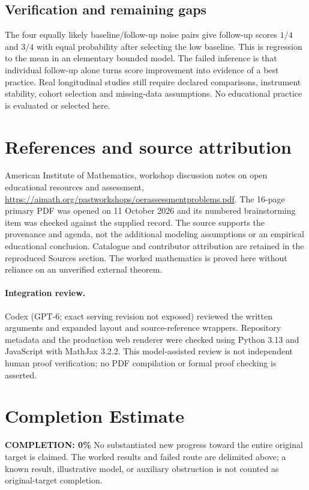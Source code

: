 \documentclass[11pt]{article}
\begin{document}
\subsection{Verification and remaining gaps}
The four equally likely baseline/follow-up noise pairs give follow-up scores $1/4$ and $3/4$ with equal probability after selecting the low baseline. This is regression to the mean in an elementary bounded model. The failed inference is that individual follow-up alone turns score improvement into evidence of a best practice. Real longitudinal studies still require declared comparisons, instrument stability, cohort selection and missing-data assumptions. No educational practice is evaluated or selected here.

\section{References and source attribution}
American Institute of Mathematics, workshop discussion notes on open educational resources and assessment, \url{https://aimath.org/pastworkshops/oerassessmentproblems.pdf}. The 16-page primary PDF was opened on 11 October 2026 and its numbered brainstorming item was checked against the supplied record. The source supports the provenance and agenda, not the additional modeling assumptions or an empirical educational conclusion. Catalogue and contributor attribution are retained in the reproduced Sources section. The worked mathematics is proved here without reliance on an unverified external theorem.


\paragraph{Integration review.} Codex (GPT-6; exact serving revision not exposed) reviewed the written arguments and expanded layout and source-reference wrappers. Repository metadata and the production web renderer were checked using Python 3.13 and JavaScript with MathJax 3.2.2. This model-assisted review is not independent human proof verification; no PDF compilation or formal proof checking is asserted.

\section{Completion Estimate}
\noindent\textbf{COMPLETION: 0\%}
No substantiated new progress toward the entire original target is claimed. The worked results and failed route are delimited above; a known result, illustrative model, or auxiliary obstruction is not counted as original-target completion.
\end{document}

